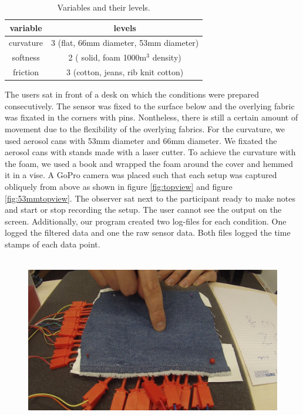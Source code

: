 \begin{table}
\begin{tabular}{|c|c|}
  \hline
  \textbf{variable}& \textbf{levels} \\
  \hline
  curvature & 3 (flat, 66mm diameter, 53mm diameter) \\
  \hline
  softness &2 ( solid, foam 1000m$^3$ density) \\
  \hline
  friction & 3 (cotton, jeans, rib knit cotton) \\
  \hline
\end{tabular}
\caption{Variables and their levels.}
\label{table:conditions}
\end{table}The users sat in front of a desk on which the conditions were prepared consecutively. The sensor was fixed to the surface below and the overlying fabric was fixated in the corners with pins. Nontheless, there is still a certain amount of movement due to the flexibility of the overlying fabrics. For the curvature, we used aerosol cans with 53mm diameter and 66mm diameter. We fixated the aerosol cans with stands made with a laser cutter. To achieve the curvature with the foam, we used a book and wrapped the foam around the cover and hemmed it in a vise. A GoPro camera was placed such that each setup was captured obliquely from above as shown in figure \ref{fig:topview} and figure \ref{fig:53mmtopview}. The observer sat next to the participant ready to make notes and start or stop recording the setup. The user cannot see the output on the screen. Additionally, our program created two log-files for each condition. One logged the filtered data and one the raw sensor data. Both files logged the time stamps of each data point.\\ \\\begin{figure}
\includegraphics[scale=0.15]{images/topview.jpg}

\end{figure}
